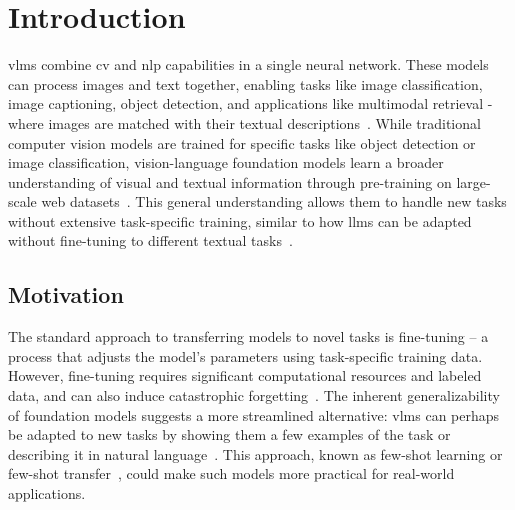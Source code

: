 \documentclass[../ShajiS_RnDReport.tex]{subfiles}
\begin{document}
\section{Introduction}
\label{sec:introduction}

\Glspl{vlm} combine \gls{cv} and \gls{nlp} capabilities in a single neural network. These models can process images and text together, enabling tasks like image classification, image captioning, object detection, and applications like multimodal retrieval - where images are matched with their textual descriptions~\cite{Bordes2024}. While traditional computer vision models are trained for specific tasks like object detection or image classification, vision-language foundation models learn a broader understanding of visual and textual information through pre-training on large-scale web datasets~\cite{Radford2021}. This general understanding allows them to handle new tasks without extensive task-specific training, similar to how \glspl{llm} can be adapted without fine-tuning to different textual tasks~\cite{Liu2023}.


\subsection{Motivation}
\label{sec:introduction:motivation}

The standard approach to transferring models to novel tasks is fine-tuning -- a process that adjusts the model's parameters using task-specific training data. However, fine-tuning requires significant computational resources and labeled data, and can also induce catastrophic forgetting~\cite{French1999}. The inherent generalizability of foundation models suggests a more streamlined alternative: \glspl{vlm} can perhaps be adapted to new tasks by showing them a few examples of the task or describing it in natural language~\cite{Tsimpoukelli2021,Li2023}. This approach, known as few-shot learning or few-shot transfer~\cite{Brown2020}, could make such models more practical for real-world applications.
\end{document}
